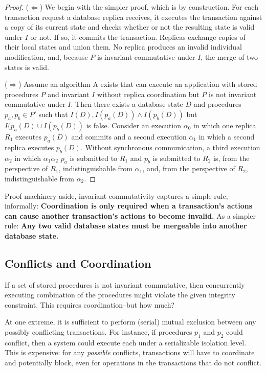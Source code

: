 \begin{proof}
($\Leftarrow$) We begin with the simpler proof, which is by
  construction. For each transaction request a database replica
  receives, it executes the transaction against a copy of its current
  state and checks whether or not the resulting state is valid under
  $I$ or not. If so, it commits the transaction. Replicas exchange
  copies of their local states and union them. No replica produces an
  invalid individual modification, and, because $P$ is invariant
  commutative under $I$, the merge of two states is valid.

($\Rightarrow$) Assume an algorithm A exists that can execute an
  application with stored procedures $P$ and invariant $I$ without
  replica coordination but $P$ is not invariant commutative under
  $I$. Then there exists a database state $D$ and procedures $p_a,p_b
  \in P'$ such that $I(D), I(p_a(D)) \wedge I(p_b(D))$ but $I(p_a(D)
  \cup I(p_b(D))$ is false. Consider an execution $\alpha_0$ in which
  one replica $R_1$ executes $p_a(D)$ and commits and a second
  execution $\alpha_1$ in which a second replica executes
  $p_b(D)$. Without synchronous communication, a third execution
  $\alpha_2$ in which $\alpha_1 \dot \alpha_2$ $p_a$ is submitted to $R_1$ and $p_b$ is
  submitted to $R_2$ is, from the perspective of $R_1$,
  indistinguishable from $\alpha_1$, and, from the perspective of
  $R_2$, indistinguishable from $\alpha_2$.
\end{proof}

Proof machinery aside, invariant commutativity captures a simple rule;
informally: \textbf{Coordination is only required when a transaction's
  actions can cause another transaction's actions to become invalid.}
As a simpler rule: \textbf{Any two valid database states must be
  mergeable into another database state.}

\subsection{Conflicts and Coordination}

If a set of stored procedures is not invariant commutative, then
concurrently executing combination of the procedures might violate the
given integrity constraint. This requires coordination--but how much?

At one extreme, it is sufficient to perform (serial) mutual exclusion
between any possibly conflicting transactions. For instance, if
procedures $p_1$ and $p_2$ could conflict, then a system could execute
each under a serializable isolation level. This is expensive: for any
\textit{possible} conflicts, transactions will have to coordinate and
potentially block, even for operations in the transactions that do not
conflict.

